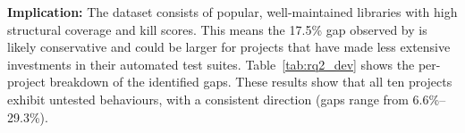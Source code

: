 






\smallskip
\noindent\textbf{Implication:} The dataset consists of popular, well-maintained libraries with high structural coverage and kill scores.
This means the 17.5\% gap observed by \toolname{} is likely conservative and could be larger for projects that have made less extensive investments in their automated test suites.
Table~\ref{tab:rq2_dev} shows the per-project breakdown of the identified gaps. 
These results show that all ten projects exhibit untested behaviours, with a consistent direction (gaps range from 6.6\%--29.3\%). 

